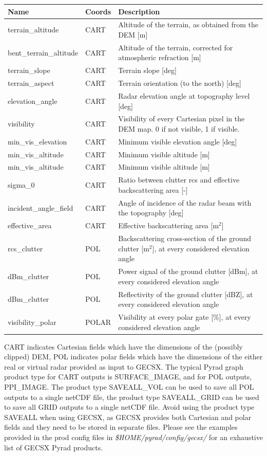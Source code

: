 \documentclass[a4paper,11pt,pdftex,twoside]{scrartcl}
\renewcommand{\bf}{\normalfont \bfseries}
\begin{document}
{{{\begin{longtable}{p{}p{}p{}}
\bf{Name}          & \bf{Coords} & \bf{Description}\\
\hline
terrain\_altitude & CART & Altitude of the terrain, as obtained from the DEM [m]\\
bent\_terrain\_altitude & CART & Altitude of the terrain, corrected for atmospheric refraction [m] \\
terrain\_slope & CART & Terrain slope [deg] \\
terrain\_aspect & CART & Terrain orientation (to the north) [deg]\\
elevation\_angle & CART & Radar elevation angle at topography level [deg] \\
visibility & CART & Visibility of every Cartesian pixel in the DEM map. 0 if not visible, 1 if visible.\\
min\_vis\_elevation & CART & Minimum visible elevation angle [deg] \\
min\_vis\_altitude & CART & Minimum visible altitude [m] \\
min\_vis\_altitude & CART & Minimum visible altitude [m] \\
sigma\_0 & CART & Ratio between clutter rcs and effective backscattering area [-] \\
incident\_angle\_field & CART & Angle of incidence of the radar beam with the topography [deg] \\
effective\_area & CART & Effective backscattering area [m$^2$] \\
rcs\_clutter & POL & Backscattering cross-section of the ground clutter [m$^2$], at every considered elevation angle\\
dBm\_clutter & POL & Power signal of the ground clutter [dBm], at every considered elevation angle\\
dBm\_clutter & POL & Reflectivity of the ground clutter [dBZ], at every considered elevation angle\\
visibility\_polar & POLAR & Visibility at every polar gate [\%], at every considered elevation angle\\
\end{longtable}

CART indicates Cartesian fields which have the dimensions of the (possibly clipped) DEM, POL indicates polar fields which have the dimensions of the either real or virtual radar provided as input to GECSX.
The typical Pyrad graph product type for CART outputs is SURFACE\_IMAGE, and for POL outputs, PPI\_IMAGE. The product type SAVEALL\_VOL can be used to save all POL outputs to a single netCDF file, the product type SAVEALL\_GRID can be used to save all GRID outputs to a single netCDF file. Avoid using the product type SAVEALL when using GECSX, as GECSX provides both Cartesian and polar fields and they need to be stored in separate files. Please see the examples provided in the prod config files in \textit{\$HOME/pyrad/config/gecsx/} for an exhaustive list of GECSX Pyrad products.

}}}
\end{document}
